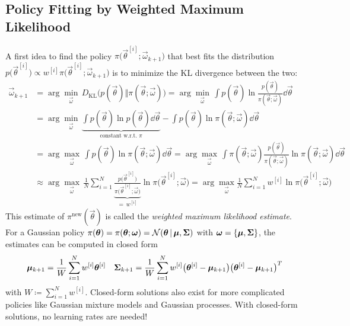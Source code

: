 		\subsection{Policy Fitting by Weighted Maximum Likelihood}
			A first idea to find the policy \( \pi\big(\vec{\theta}^{[i]}; \vec{\omega}_{k + 1}\big) \) that best fits the distribution \( p\big(\vec{\theta}^{[i]}\big) \propto w^{[i]} \pi\big(\vec{\theta}^{[i]}; \vec{\omega}_{k + 1}\big) \) is to minimize the KL divergence between the two:
			\begin{align}
				\vec{\omega}_{k + 1}
				 & = \arg\min_{\vec{\omega}}\, D_\mathrm{KL}\big( p(\vec{\theta}) \Vert \pi(\vec{\theta}; \vec{\omega}) \big)
				= \arg\min_{\vec{\omega}}\, \int\! p(\vec{\theta}) \ln \frac{p(\vec{\theta})}{\pi(\vec{\theta}; \vec{\omega})} \dd{\vec{\theta}}  \nonumber                                                                                        \\
				 & = \arg\min_{\vec{\omega}}\, \underbrace{\int\! p(\vec{\theta}) \ln p(\vec{\theta}) \dd{\vec{\theta}}}_\text{constant w.r.t. \(\pi\)} - \int\! p(\vec{\theta}) \ln \pi(\vec{\theta}; \vec{\omega}) \dd{\vec{\theta}}  \nonumber  \\
				 & = \arg\max_{\vec{\omega}}\, \int\! p(\vec{\theta}) \ln \pi(\vec{\theta}; \vec{\omega}) \dd{\vec{\theta}}
				= \arg\max_{\vec{\omega}}\, \int\! \pi(\vec{\theta}; \vec{\omega}) \frac{p(\vec{\theta})}{\pi(\vec{\theta}; \vec{\omega})} \ln \pi(\vec{\theta}; \vec{\omega}) \dd{\vec{\theta}}  \nonumber                                        \\
				 & \approx \arg\max_{\vec{\omega}}\, \frac{1}{N} \sum_{i = 1}^{N} \underbrace{\frac{p\big(\vec{\theta}^{[i]}\big)}{\pi\big(\vec{\theta}^{[i]}; \vec{\omega}\big)}}_{=\, w^{[i]}} \ln \pi\big(\vec{\theta}^{[i]}; \vec{\omega}\big)
				= \arg\max_{\vec{\omega}} \frac{1}{N} \sum_{i = 1}^{N} w^{[i]} \ln \pi\big(\vec{\theta}^{[i]}; \vec{\omega}\big)  \label{eq:weightedMaxLikelihoodObjective}
			\end{align}
			This estimate of \( \pi^\mathrm{new}(\vec{\theta}) \) is called the \emph{weighted maximum likelihood estimate}. For a Gaussian policy \( \pi(\bm{\theta}) = \pi(\bm{\theta}; \bm{\omega}) = \mathcal{N}(\bm{\theta} \,\vert\, \bm{\mu}, \bm{\Sigma}) \) with \( \bm{\omega} = \{ \bm{\mu}, \bm{\Sigma} \} \), the estimates can be computed in closed form
			\begin{align*}
				\bm{\mu}_{k + 1} = \frac{1}{W} \sum_{i = 1}^{N} w^{[i]} \bm{\theta}^{[i]}
				 &  &
				\bm{\Sigma}_{k + 1} = \frac{1}{W} \sum_{i = 1}^{N} w^{[i]} \big( \bm{\theta}^{[i]} - \bm{\mu}_{k + 1} \big) \big( \bm{\theta}^{[i]} - \bm{\mu}_{k + 1} \big)^T
			\end{align*}
			with \( W \coloneqq \sum_{i = 1}^{N} w^{[i]} \). Closed-form solutions also exist for more complicated policies like Gaussian mixture models and Gaussian processes. With closed-form solutions, no learning rates are needed!

